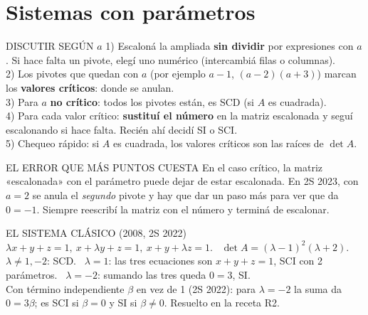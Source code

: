 \section{Sistemas con parámetros}
\begin{metodo}{DISCUTIR SEGÚN $a$}
1) Escaloná la ampliada \textbf{sin dividir} por expresiones con $a$. Si hace falta un pivote, elegí uno numérico (intercambiá filas o columnas).\\
2) Los pivotes que quedan con $a$ (por ejemplo $a-1$, $(a-2)(a+3)$) marcan los \textbf{valores críticos}: donde se anulan.\\
3) Para $a$ \textbf{no crítico}: todos los pivotes están, es SCD (si $A$ es cuadrada).\\
4) Para cada valor crítico: \textbf{sustituí el número} en la matriz escalonada y seguí escalonando si hace falta. Recién ahí decidí SI o SCI.\\
5) Chequeo rápido: si $A$ es cuadrada, los valores críticos son las raíces de $\det A$.
\end{metodo}
\begin{trampa}{EL ERROR QUE MÁS PUNTOS CUESTA}
En el caso crítico, la matriz «escalonada» con el parámetro puede dejar de estar escalonada. En 2S 2023, con $a=2$ se anula el \emph{segundo} pivote y hay que dar un paso más para ver que da $0=-1$. Siempre reescribí la matriz con el número y terminá de escalonar.
\end{trampa}
\begin{memo}{EL SISTEMA CLÁSICO (2008, 2S 2022)}
$\lambda x+y+z=1,\ x+\lambda y+z=1,\ x+y+\lambda z=1$. \ $\det A=(\lambda-1)^2(\lambda+2)$.\\
$\lambda\neq1,-2$: SCD. \ $\lambda=1$: las tres ecuaciones son $x+y+z=1$, SCI con 2 parámetros. \ $\lambda=-2$: sumando las tres queda $0=3$, SI.\\
Con término independiente $\beta$ en vez de 1 (2S 2022): para $\lambda=-2$ la suma da $0=3\beta$; es SCI si $\beta=0$ y SI si $\beta\neq0$. Resuelto en la receta R2.
\end{memo}

